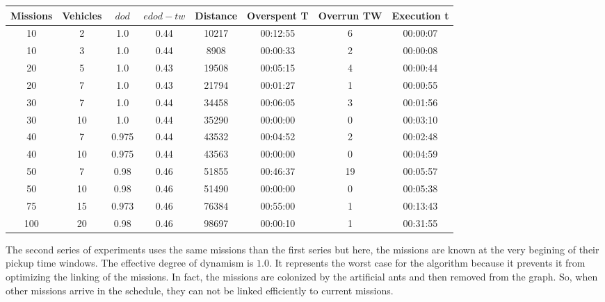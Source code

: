 \documentclass[a4paper,10pt]{article}
\begin{document}
  \small
  \begin{center}
    \begin{tabular}{|c|c|c|c|c|c|c|c|} 
    \hline
    \bf{Missions} & \bf{Vehicles} & \bf{$dod$} & \bf{$edod-tw$} & \bf{Distance} & \bf{Overspent T} & \bf{Overrun TW} &  \bf{Execution t} \\ \hline
    10	 & 2 	& 1.0	& 0.44	& 10217	& 00:12:55	& 6	& 00:00:07\\
    10	 & 3 	& 1.0	& 0.44	& 8908	& 00:00:33	& 2	& 00:00:08\\
    20	 & 5 	& 1.0	& 0.43	& 19508	& 00:05:15	& 4	& 00:00:44\\
    20	 & 7 	& 1.0	& 0.43	& 21794	& 00:01:27	& 1	& 00:00:55\\
    30	 & 7 	& 1.0	& 0.44	& 34458	& 00:06:05	& 3	& 00:01:56\\
    30	 & 10 	& 1.0	& 0.44	& 35290	& 00:00:00	& 0	& 00:03:10\\
    40	 & 7 	& 0.975	& 0.44	& 43532	& 00:04:52	& 2	& 00:02:48\\
    40	 & 10 	& 0.975	& 0.44	& 43563	& 00:00:00	& 0	& 00:04:59\\
    50	 & 7 	& 0.98	& 0.46	& 51855	& 00:46:37	& 19	& 00:05:57\\
    50	 & 10 	& 0.98	& 0.46	& 51490	& 00:00:00	& 0	& 00:05:38\\
    75	 & 15 	& 0.973	& 0.46	& 76384	& 00:55:00	& 1	& 00:13:43\\
    100	 & 20 	& 0.98	& 0.46	& 98697	& 00:00:10	& 1	& 00:31:55\\
    \hline
    \end{tabular}
  \end{center}
  \normalsize

  The second series of experiments uses the same missions than the first series but here, the missions are known at the very begining of their pickup time windows. The effective degree of dynamism is $1.0$. It represents the worst case for the algorithm because it prevents it from optimizing the linking of the missions. In fact, the missions are colonized by the artificial ants and then removed from the graph. So, when other missions arrive in the schedule, they can not be linked efficiently to current missions.
\end{document}
